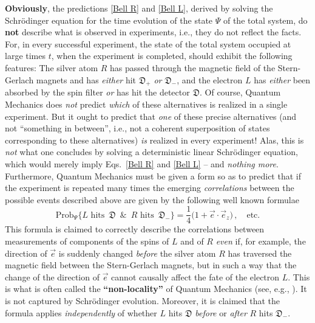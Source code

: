 \documentclass[a4paper,11pt]{article}
\begin{document}
{\bf{Obviously}}, the predictions \eqref{Bell R} and \eqref{Bell L}, derived by solving the Schr\"odinger equation for 
the time evolution of the state $\Psi$ of the total system, do {\bf{not}} describe what is observed in experiments, i.e.,
they do not reflect the facts. For, in every successful experiment, the state of the total system occupied at large times 
$t$, when the experiment is completed, should exhibit the following features: 
The silver atom $R$ has passed through the magnetic field of the Stern-Gerlach magnets and has \textit{either} hit 
$\mathfrak{D}_{+}$ \textit{or} $\mathfrak{D}_{-}$, and the electron $L$ has \textit{either} been absorbed by the 
spin filter \textit{or} has hit the detector $\mathfrak{D}$. Of course, Quantum Mechanics does \textit{not} predict \textit{which} 
of these alternatives is realized in a single experiment. But it ought to predict that \textit{one} of these
precise alternatives (and not ``something in between'', i.e., not a coherent superposition of states corresponding 
to these alternatives) \textit{is} realized in every experiment! Alas, this is \textit{not} 
what one concludes by solving a deterministic linear Schr\"odinger equation, which would merely imply Eqs.~\eqref{Bell R} 
and \eqref{Bell L} -- and \textit{nothing more}. Furthermore, Quantum Mechanics must be given a form so as to predict
that if the experiment is repeated many times the emerging \textit{correlations} between the possible events described above
are given by the following well known formulae
\begin{equation}\label{probability}
\text{Prob}_{\Psi}\big\{L \text{ hits }\, \mathfrak{D}\,\,\, \& \, \,\,R \text{ hits } \,\mathfrak{D}_{-} \big\} = 
\frac{1}{4}\Big(1 + \vec{e}\cdot \vec{e}_z\Big)\,, \quad \text{etc.}
\end{equation}
This formula is claimed to correctly describe the correlations between measurements of components  of the spins of $L$ 
and of $R$ \textit{even} if, for example, the direction of $\vec{e}$ is suddenly changed \textit{before} the silver atom $R$ 
has traversed the magnetic field between the Stern-Gerlach magnets, but in such a way that the change of the direction 
of $\vec{e}$ cannot causally affect the fate of the electron $L$. This is what is often called the {\bf{``non-locality''}} of 
Quantum Mechanics (see, e.g., \cite{BGold}). It is not captured by Schr\"odinger evolution. Moreover, it is claimed that the formula applies 
\textit{independently} of whether $L$ hits $\mathfrak{D}$ \textit{before} or \textit{after} $R$ hits $\mathfrak{D}_{-}$.
\end{document}
